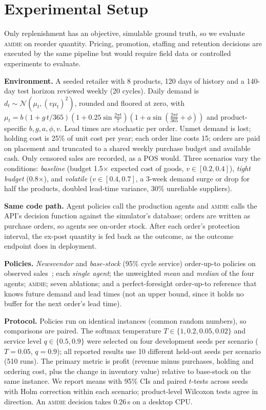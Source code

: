 \documentclass[conference]{IEEEtran}
\newcommand{\amdie}{\textsc{amdie}}
\begin{document}
\section{Experimental Setup}
Only replenishment has an objective, simulable ground truth, so we evaluate \amdie{} on reorder quantity. Pricing, promotion, staffing and retention decisions are executed by the same pipeline but would require field data or controlled experiments to evaluate.

\textbf{Environment.} A seeded retailer with 8 products, 120 days of history and a 140-day test horizon reviewed weekly (20 cycles). Daily demand is $d_t\sim\mathcal N(\mu_t,(v\mu_t)^2)$, rounded and floored at zero, with $\mu_t=b(1+g\,t/365)(1+0.25\sin\frac{2\pi t}{7})(1+a\sin(\frac{2\pi t}{365}+\phi))$ and product-specific $b,g,a,\phi,v$. Lead times are stochastic per order. Unmet demand is lost; holding cost is 25\% of unit cost per year; each order line costs 15; orders are paid on placement and truncated to a shared weekly purchase budget and available cash. Only censored sales are recorded, as a POS would. Three scenarios vary the conditions: \emph{baseline} (budget 1.5$\times$ expected cost of goods, $v\in[0.2,0.4]$), \emph{tight budget} (0.8$\times$), and \emph{volatile} ($v\in[0.4,0.7]$, a 3-week demand surge or drop for half the products, doubled lead-time variance, 30\% unreliable suppliers).

\textbf{Same code path.} Agent policies call the production agents and \amdie{} calls the API's decision function against the simulator's database; orders are written as purchase orders, so agents see on-order stock. After each order's protection interval, the ex-post quantity is fed back as the outcome, as the outcome endpoint does in deployment.

\textbf{Policies.} \emph{Newsvendor} and \emph{base-stock} (95\% cycle service) order-up-to policies on observed sales~\cite{zipkin2000}; each \emph{single agent}; the unweighted \emph{mean} and \emph{median} of the four agents; \amdie{}; seven ablations; and a perfect-foresight order-up-to reference that knows future demand and lead times (not an upper bound, since it holds no buffer for the next order's lead time).

\textbf{Protocol.} Policies run on identical instances (common random numbers), so comparisons are paired. The softmax temperature $T\in\{1,0.2,0.05,0.02\}$ and service level $q\in\{0.5,0.9\}$ were selected on four development seeds per scenario ($T=0.05$, $q=0.9$); all reported results use 10 different held-out seeds per scenario (510 runs). The primary metric is profit (revenue minus purchases, holding and ordering cost, plus the change in inventory value) relative to base-stock on the same instance. We report means with 95\% CIs and paired $t$-tests across seeds with Holm correction within each scenario; product-level Wilcoxon tests agree in direction. An \amdie{} decision takes 0.26\,s on a desktop CPU.
\end{document}
